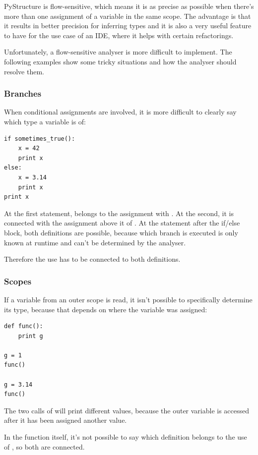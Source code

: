 \documentclass[12pt,halfparskip,DIV11,BCOR10mm]{scrreprt}
\begin{document}
PyStructure is flow-sensitive, which means it is as precise as possible when there's more than one assignment of a variable in the same scope. The advantage is that it results in better precision for inferring types and it is also a very useful feature to have for the use case of an IDE, where it helps with certain refactorings.

Unfortunately, a flow-sensitive analyser is more difficult to implement. The following examples show some tricky situations and how the analyser should resolve them.

\subsubsection{Branches}

When conditional assignments are involved, it is more difficult to clearly say which type a variable is of:

\begin{lstlisting}
if sometimes_true():
    x = 42
    print x
else:
    x = 3.14
    print x
print x
\end{lstlisting}

At the first  statement,  belongs to the assignment with . At the second, it is connected with the assignment above it of . At the  statement after the if/else block, both definitions are possible, because which branch is executed is only known at runtime and can't be determined by the analyser. 

Therefore the use has to be connected to both definitions.

\subsubsection{Scopes}

If a variable from an outer scope is read, it isn't possible to specifically determine its type, because that depends on where the variable was assigned:

\begin{lstlisting}
def func():
    print g

g = 1
func()

g = 3.14
func()
\end{lstlisting}

The two calls of  will print different values, because the outer variable  is accessed after it has been assigned another value. 

In the function itself, it's not possible to say which definition belongs to the use of , so both are connected.
\end{document}
